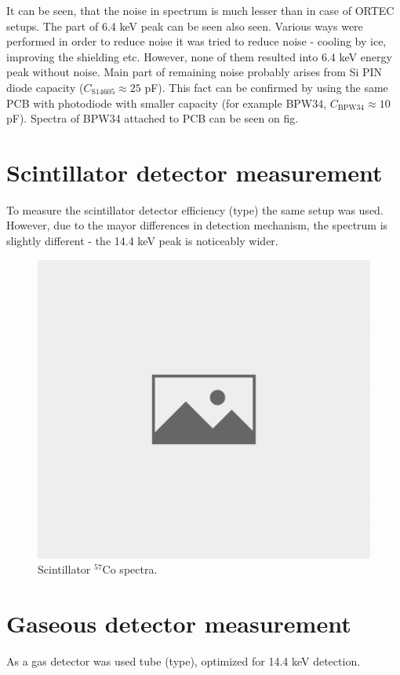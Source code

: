 It can be seen, that the noise in spectrum is much lesser than in case of ORTEC setups. The part of 6.4 keV peak can be seen also seen. Various ways were performed in order to reduce noise it was tried to reduce noise - cooling by ice, improving the shielding etc. However, none of them resulted into 6.4 keV energy peak without noise. Main part of remaining noise probably arises from Si PIN diode capacity ($C_{\textrm{S14605}} \approx 25$ pF). This fact can be confirmed by using the same PCB with photodiode with smaller capacity (for example BPW34, $C_{\textrm{BPW34}} \approx 10$ pF). Spectra of BPW34 attached to PCB can be seen on fig.



\section{Scintillator detector measurement}
To measure the scintillator detector efficiency (type) the same setup was used. However, due to the mayor differences in detection mechanism, the spectrum is slightly different - the 14.4 keV peak is noticeably wider.

\begin{figure}[H]
\centering
\includegraphics[scale=0.8, angle = 90]{./pictures/NoPicture.jpg}
\caption{Scintillator $^{57}$Co spectra.}
\label{Scintillator spectra.}
\end{figure}


\section{Gaseous detector measurement}
As a gas detector was used tube (type), optimized for 14.4 keV detection.

